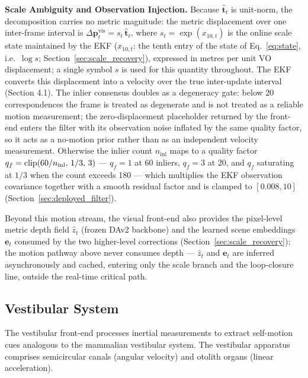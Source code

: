 \textbf{Scale Ambiguity and Observation Injection.} Because $\hat{\mathbf{t}}_t$ is unit-norm, the decomposition carries no metric magnitude: the metric displacement over one inter-frame interval is $\Delta\mathbf{p}^{\mathrm{vis}}_t = s_t\,\hat{\mathbf{t}}_t$, where $s_t = \exp(x_{10,t})$ is the online scale state maintained by the EKF ($x_{10,t}$: the tenth entry of the state of Eq.~\eqref{eq:state}, i.e.\ $\log s$; Section~\ref{sec:scale_recovery}), expressed in metres per unit VO displacement; a single symbol $s$ is used for this quantity throughout. The EKF converts this displacement into a velocity over the true inter-update interval (Section 4.1). The inlier consensus doubles as a degeneracy gate: below 20 correspondences the frame is treated as degenerate and is not treated as a reliable motion measurement; the zero-displacement placeholder returned by the front-end enters the filter with its observation noise inflated by the same quality factor, so it acts as a no-motion prior rather than as an independent velocity measurement. Otherwise the inlier count $n_{\mathrm{inl}}$ maps to a quality factor $q_f=\operatorname{clip}(60/n_{\mathrm{inl}},\,1/3,\,3)$ --- $q_f{=}1$ at 60 inliers, $q_f{=}3$ at 20, and $q_f$ saturating at $1/3$ when the count exceeds 180 --- which multiplies the EKF observation covariance together with a smooth residual factor and is clamped to $[0.008,10]$ (Section~\ref{sec:deployed_filter}).

Beyond this motion stream, the visual front-end also provides the pixel-level metric depth field $\hat z_t$ (frozen DAv2 backbone) and the learned scene embeddings $\boldsymbol{e}_t$ consumed by the two higher-level corrections (Section~\ref{sec:scale_recovery}); the motion pathway above never consumes depth --- $\hat z_t$ and $\boldsymbol{e}_t$ are inferred asynchronously and cached, entering only the scale branch and the loop-closure line, outside the real-time critical path.

\subsection{Vestibular System}
\label{sec:vestibular}

The vestibular front-end processes inertial measurements to extract self-motion cues analogous to the mammalian ves\-tib\-u\-lar system. The ves\-tib\-u\-lar apparatus comprises semicircular canals (angular velocity) and otolith organs (linear acceleration).

